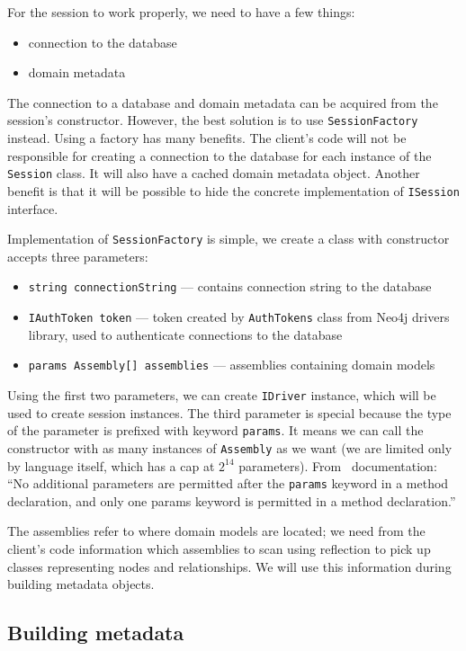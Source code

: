 For the session to work properly, we need to have a few things:

\begin{itemize}
    \item connection to the database
    \item domain metadata
\end{itemize}

The connection to a database and domain metadata can be acquired from the session's constructor.
However, the best solution is to use \texttt{SessionFactory} instead.
Using a factory has many benefits.
The client's code will not be responsible for creating a connection to the database for each instance of the \texttt{Session} class.
It will also have a cached domain metadata object.
Another benefit is that it will be possible to hide the concrete implementation of \texttt{ISession} interface.

Implementation of \texttt{SessionFactory} is simple, we create a class with constructor accepts three parameters:
\begin{itemize}
    \item {\texttt{string connectionString} --- contains connection string to the database}
    \item {\texttt{IAuthToken token} --- token created by \texttt{AuthTokens} class from Neo4j drivers library, used to authenticate connections to the database}
    \item {\texttt{params Assembly[] assemblies} --- assemblies containing domain models}
\end{itemize}
Using the first two parameters, we can create \texttt{IDriver} instance, which will be used to create session instances. The third parameter is special
because the type of the parameter is prefixed with keyword \texttt{params}. It means we can call the constructor with as many instances of \texttt{Assembly} as we want
(we are limited only by language itself, which has a cap at $2^{14}$ parameters). From \CS\ documentation:
``No additional parameters are permitted after the \texttt{params} keyword in a method declaration, and only one params keyword is permitted in a method declaration.'' \cite{wagner_params_nodate}

The assemblies refer to where domain models are located;
we need from the client's code information which assemblies to scan using reflection to pick up classes representing nodes and relationships.
We will use this information during building metadata objects.

\subsection {Building metadata}

